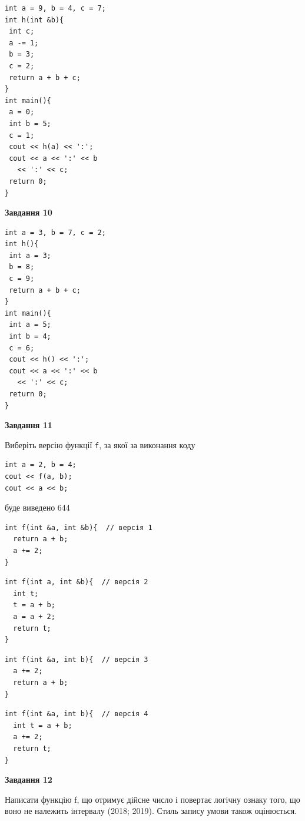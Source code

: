\documentclass[12pt, ukrainian]{article}
\def\code#1{\Verb!#1!}
\begin{document}
{\begin {large}
\begin{minipage}[t]{7.0cm}
\begin{verbatim}
int a = 9, b = 4, c = 7;
int h(int &b){
 int c;
 a -= 1;
 b = 3;
 c = 2;
 return a + b + c;
}
int main(){
 a = 0;
 int b = 5;
 c = 1;
 cout << h(a) << ':';
 cout << a << ':' << b 
   << ':' << c;
 return 0;
}
\end{verbatim}



\begin{center}
\textbf{Завдання 10}
\end{center}
\vspace{-8mm}

\begin{verbatim}
int a = 3, b = 7, c = 2;
int h(){
 int a = 3;
 b = 8;
 c = 9;
 return a + b + c;
}
int main(){
 int a = 5;
 int b = 4;
 c = 6;
 cout << h() << ':';
 cout << a << ':' << b 
   << ':' << c;
 return 0;
}
\end{verbatim}

\end{minipage}
\vline \hspace{1mm}
\begin{minipage}[t]{11.0cm}

\begin{center}
\textbf{Завдання 11}
\end{center}
Виберіть версію функції \code{f}, за якої за виконання коду
\begin{verbatim}
int a = 2, b = 4;
cout << f(a, b);
cout << a << b;
\end{verbatim}

буде виведено 644

\begin{verbatim}
int f(int &a, int &b){  // версія 1
  return a + b;
  a += 2;
}
\end{verbatim}

\vspace{-8mm}\begin{verbatim}
int f(int a, int &b){  // версія 2
  int t;
  t = a + b;
  a = a + 2;
  return t;
}
\end{verbatim}

\vspace{-8mm}\begin{verbatim}
int f(int &a, int b){  // версія 3
  a += 2;
  return a + b;
}
\end{verbatim}

\vspace{-8mm}\begin{verbatim}
int f(int &a, int b){  // версія 4
  int t = a + b;
  a += 2;
  return t;
}
\end{verbatim}



\begin{center}
\textbf{Завдання 12}
\end{center}

Написати функцiю f, що отримує дійсне число і повертає логічну ознаку того, що воно не належить iнтервалу (2018; 2019). Стиль запису умови також оцінюється.\par

\end{minipage}

\end {large}}
\end{document}

